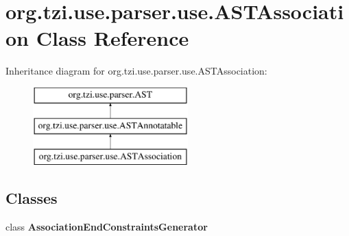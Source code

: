 \hypertarget{classorg_1_1tzi_1_1use_1_1parser_1_1use_1_1_a_s_t_association}{\section{org.\-tzi.\-use.\-parser.\-use.\-A\-S\-T\-Association Class Reference}
\label{classorg_1_1tzi_1_1use_1_1parser_1_1use_1_1_a_s_t_association}
}
Inheritance diagram for org.\-tzi.\-use.\-parser.\-use.\-A\-S\-T\-Association\-:\begin{figure}[H]
\begin{center}
\leavevmode
\includegraphics[height=3.000000cm]{classorg_1_1tzi_1_1use_1_1parser_1_1use_1_1_a_s_t_association}
\end{center}
\end{figure}
\subsection*{Classes}
\begin{DoxyCompactItemize}
\item 
class {\bfseries Association\-End\-Constraints\-Generator}
\end{DoxyCompactItemize}
